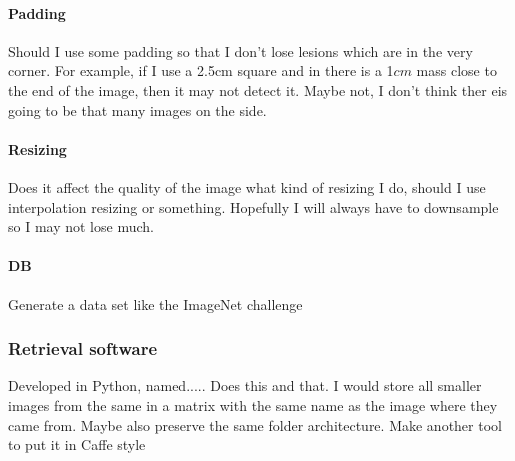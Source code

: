 \paragraph{Padding}
Should I use some padding so that I don't lose lesions which are in the very corner. For example, if I use a 2.5cm square and in there is a 1$cm$ mass close to the end of the image, then it may not detect it. Maybe not, I don't think ther eis going to be that many images on the side.

\paragraph{Resizing}
Does it affect the quality of the image what kind of resizing I do, should I use interpolation resizing or something. Hopefully I will always have to downsample so I may not lose much.

\paragraph{DB}
Generate a data set like the ImageNet challenge



\subsubsection{Retrieval software}
Developed in Python, named..... Does this and that. I would store all smaller images from the same in a matrix with the same name as the image where they came from. Maybe also preserve the same folder architecture.
Make another tool to put it in Caffe style

